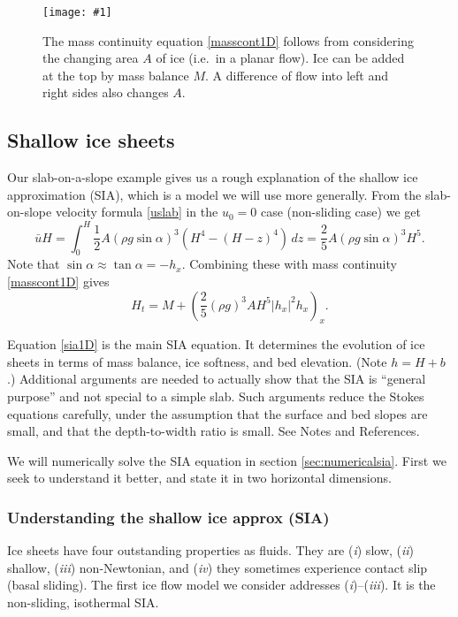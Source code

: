 \documentclass[titlepage,a4paper,final,12pt]{scrartcl}
\newcommand{\onefigsize}[3]{
\begin{figure}[ht]
\centering
\texttt{[image: \#1]}
\caption{#2}
\label{fig:#1}
\end{figure}}
\begin{document}
\onefigsize{slabmasscontfig}{The mass continuity equation \eqref{masscont1D} follows from considering the changing area $A$ of ice (i.e.~in a planar flow).  Ice can be added at the top by mass balance $M$.  A difference of flow into left and right sides also changes $A$.}{2.5in}


\subsection{Shallow ice sheets}

Our slab-on-a-slope example gives us a rough explanation of the shallow ice approximation (SIA), which is a model we will use more generally.  From the slab-on-slope velocity formula \eqref{uslab} in the $u_0=0$ case (non-sliding case) we get
\begin{equation}
\bar u H = \int_0^H \frac{1}{2} A (\rho g \sin\alpha)^3  \left(H^4 - (H-z)^4\right)\,dz = \frac{2}{5} A (\rho g \sin\alpha)^3 H^5. \label{siaubar}
\end{equation}
Note that $\sin \alpha \approx \tan\alpha = - h_x$.  Combining these with mass continuity \eqref{masscont1D} gives
\begin{equation}
  H_t = M + \left(\frac{2}{5} (\rho g)^3 A H^5 |h_x|^2 h_x\right)_x. \label{sia1D}
\end{equation}

Equation \eqref{sia1D} is the main SIA equation.  It determines the evolution of ice sheets in terms of mass balance, ice softness, and bed elevation.  (Note $h=H+b$.)  Additional arguments are needed to actually show that the SIA is ``general purpose'' and not special to a simple slab.  Such arguments reduce the Stokes equations carefully, under the assumption that the surface and bed slopes are small, and that the depth-to-width ratio is small.  See Notes and References.

We will numerically solve the SIA equation in section \ref{sec:numericalsia}.  First we seek to understand it better, and state it in two horizontal dimensions.

\subsubsection*{Understanding the shallow ice approx (SIA)}  Ice sheets have four outstanding properties as fluids.  They are (\emph{i}) slow, (\emph{ii}) shallow,  (\emph{iii}) non-Newtonian, and (\emph{iv}) they sometimes experience contact slip (basal sliding).  The first ice flow model we consider addresses (\emph{i})--(\emph{iii}).  It is the non-sliding, isothermal SIA.
\end{document}
